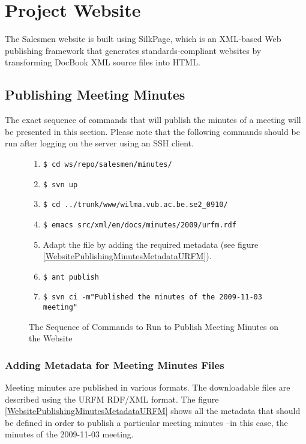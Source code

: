 \section{Project Website}\label{Website}

The Salesmen website is built using SilkPage, which is an XML-based 
Web publishing framework that generates standards-compliant websites by
transforming DocBook XML source files into HTML.

\subsection{Publishing Meeting Minutes}\label{WebsitePublishingMinutes}
The exact sequence of commands that will publish the minutes of a
meeting will be presented in this section. Please note that the following
commands should be run after logging on the server using an SSH client.

\begin{figure}[hb]
\caption{The Sequence of Commands to Run to Publish Meeting Minutes on the Website}
\label{WebsitePublishingMinutesCommands}
\begin{enumerate}
\item \verb*#$ cd ws/repo/salesmen/minutes/#
\item \verb*#$ svn up#
\item \verb*#$ cd ../trunk/www/wilma.vub.ac.be.se2_0910/#
\item \verb*#$ emacs src/xml/en/docs/minutes/2009/urfm.rdf#
\item Adapt the file by adding the required metadata (see figure \ref{WebsitePublishingMinutesMetadataURFM}).
\item \verb*#$ ant publish#
\item \verb*#$ svn ci -m"Published the minutes of the 2009-11-03 meeting"#
\end{enumerate}
\end{figure}

\subsubsection{Adding Metadata for Meeting Minutes Files}\label{WebsitePublishingMinutesMetadata}

Meeting minutes are published in various formats. The downloadable files
are described using the URFM RDF/XML format. 
The figure \ref{WebsitePublishingMinutesMetadataURFM} shows all the 
metadata that should be defined in order to publish a particular meeting
minutes --in this case, the minutes of the 2009-11-03 meeting.

